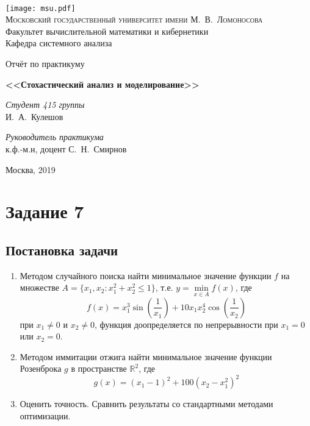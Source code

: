 \documentclass[oneside, final, 12pt]{article}
\begin{document}
\thispagestyle{empty}

\begin{center}
\ \vspace{-3cm}

\texttt{[image: msu.pdf]}\\
{\scshape Московский государственный университет имени М.~В.~Ломоносова}\\
Факультет вычислительной математики и кибернетики\\
Кафедра системного анализа

\vfill

{\LARGE Отчёт по практикуму}

\vspace{1cm}

{\Huge\bfseries <<Стохастический анализ и моделирование>>}
\end{center}

\vspace{1cm}

\begin{flushright}
    \large
    \textit{Студент 415 группы}\\
    И.~А.~Кулешов
    \vspace{5mm}
    
    \textit{Руководитель практикума}\\
    к.ф.-м.н, доцент С.~Н.~Смирнов
\end{flushright}

\vfill

\begin{center}
Москва, 2019
\end{center}

\newpage
\tableofcontents

\newpage
\section{Задание 7}

\subsection{Постановка задачи}
    \begin{enumerate} 
        \item Методом случайного поиска найти минимальное значение функции $f$ на множестве 
        	$A = \{x_1, x_2: x_1^2+x_2^2\leqslant 1\}$, т.е. $y= \min\limits_{x\in A} f(x)$, где 
       	$$ f(x) = x_1^3\sin\left(\frac{1}{x_1}\right)+ 10 x_1 x_2^4 \cos\left(\frac{1}{x_2}\right)$$
       	при $x_1 \neq 0$ и $x_2 \neq 0$, функция доопределяется по непрерывности при $x_1=0$ или $x_2= 0$.
        \item Методом иммитации отжига найти минимальное значение функции Розенброка $g$ в пространстве
        		$\mathbb{R}^2$, где
        		$$ g(x) = (x_1 -1)^2+100(x_2-x_1^2)^2$$
        \item Оценить точность. Сравнить результаты со стандартными методами оптимизации.
    \end{enumerate}
\end{document}
